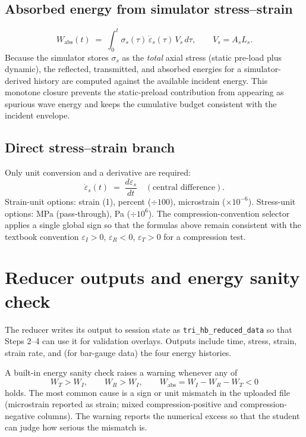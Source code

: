 \documentclass[11pt,a4paper,openany]{book}
\theoremstyle{handbook}
\newcommand{\sig}{\sigma}
\newcommand{\eps}{\varepsilon}
\newcommand{\epsdot}{\dot\eps}
\newcommand{\As}{A_s}
\newcommand{\Ls}{L_s}
\begin{document}
\subsection*{Absorbed energy from simulator stress--strain}
\begin{equation}
  W_{\text{abs}}(t) \;=\; \int_{0}^{t}\!\sig_s(\tau)\,\epsdot_s(\tau)\,V_s\,d\tau,
  \qquad V_s=\As\Ls.
\end{equation}
Because the simulator stores $\sig_s$ as the \emph{total} axial stress
(static pre-load plus dynamic), the reflected, transmitted, and absorbed
energies for a simulator-derived history are computed against the
available incident energy. This monotone closure prevents the
static-preload contribution from appearing as spurious wave energy and
keeps the cumulative budget consistent with the incident envelope.

\subsection*{Direct stress--strain branch}
Only unit conversion and a derivative are required:
\begin{equation}
  \epsdot_s(t) \;=\; \frac{d\eps_s}{dt} \quad (\text{central difference}).
\end{equation}
Strain-unit options: strain (1), percent ($\div 100$), microstrain
($\times 10^{-6}$). Stress-unit options: MPa (pass-through), Pa
($\div 10^{6}$). The compression-convention selector applies a single
global sign so that the formulas above remain consistent with the
textbook convention $\eps_I>0$, $\eps_R<0$, $\eps_T>0$ for a
compression test.

\section{Reducer outputs and energy sanity check}

The reducer writes its output to session state as
\texttt{tri\_hb\_reduced\_data} so that Steps 2--4 can use it for
validation overlays. Outputs include time, stress, strain, strain rate,
and (for bar-gauge data) the four energy histories.

A built-in energy sanity check raises a warning whenever any of
\begin{equation}
  W_T > W_I, \qquad W_R > W_I, \qquad W_{\text{abs}}=W_I-W_R-W_T < 0
\end{equation}
holds. The most common cause is a sign or unit mismatch in the uploaded
file (microstrain reported as strain; mixed compression-positive and
compression-negative columns). The warning reports the numerical excess
so that the student can judge how serious the mismatch is.
\end{document}
